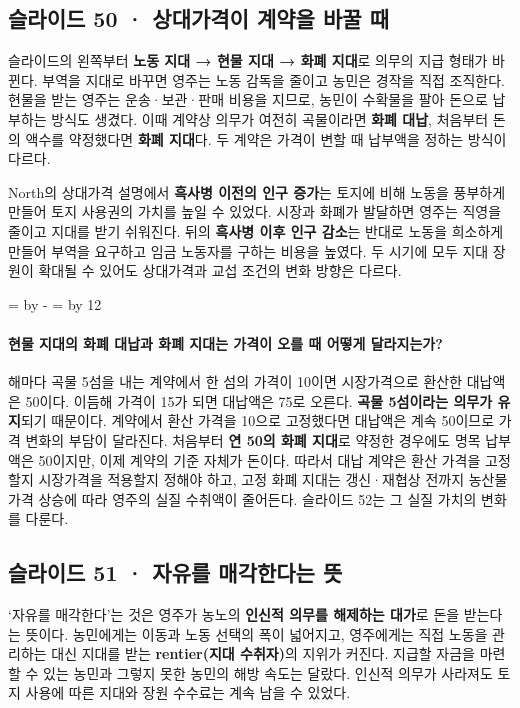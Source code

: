 \documentclass[10pt,a4paper]{article}
\newcommand{\ReserveQuestionSpace}{%
  \par\begingroup
  \dimen0=\pagegoal \advance\dimen0 by -\pagetotal
  \dimen2=\baselineskip \multiply\dimen2 by 12
  \ifdim\dimen0<\dimen2 \newpage\fi
  \endgroup}
\begin{document}
\subsection{슬라이드 50 · 상대가격이 계약을 바꿀 때}
슬라이드의 왼쪽부터 \textbf{노동 지대 → 현물 지대 → 화폐 지대}로 의무의 지급 형태가 바뀐다. 부역을 지대로 바꾸면 영주는 노동 감독을 줄이고 농민은 경작을 직접 조직한다. 현물을 받는 영주는 운송·보관·판매 비용을 지므로, 농민이 수확물을 팔아 돈으로 납부하는 방식도 생겼다. 이때 계약상 의무가 여전히 곡물이라면 \textbf{화폐 대납}, 처음부터 돈의 액수를 약정했다면 \textbf{화폐 지대}다. 두 계약은 가격이 변할 때 납부액을 정하는 방식이 다르다.\par

North의 상대가격 설명에서 \textbf{흑사병 이전의 인구 증가}는 토지에 비해 노동을 풍부하게 만들어 토지 사용권의 가치를 높일 수 있었다. 시장과 화폐가 발달하면 영주는 직영을 줄이고 지대를 받기 쉬워진다. 뒤의 \textbf{흑사병 이후 인구 감소}는 반대로 노동을 희소하게 만들어 부역을 요구하고 임금 노동자를 구하는 비용을 높였다. 두 시기에 모두 지대 장원이 확대될 수 있어도 상대가격과 교섭 조건의 변화 방향은 다르다.\par

\ReserveQuestionSpace
\paragraph{현물 지대의 화폐 대납과 화폐 지대는 가격이 오를 때 어떻게 달라지는가?}
해마다 곡물 5섬을 내는 계약에서 한 섬의 가격이 10이면 시장가격으로 환산한 대납액은 50이다. 이듬해 가격이 15가 되면 대납액은 75로 오른다. \textbf{곡물 5섬이라는 의무가 유지}되기 때문이다. 계약에서 환산 가격을 10으로 고정했다면 대납액은 계속 50이므로 가격 변화의 부담이 달라진다. 처음부터 \textbf{연 50의 화폐 지대}로 약정한 경우에도 명목 납부액은 50이지만, 이제 계약의 기준 자체가 돈이다. 따라서 대납 계약은 환산 가격을 고정할지 시장가격을 적용할지 정해야 하고, 고정 화폐 지대는 갱신·재협상 전까지 농산물 가격 상승에 따라 영주의 실질 수취액이 줄어든다. 슬라이드 52는 그 실질 가치의 변화를 다룬다.\par

\subsection{슬라이드 51 · 자유를 매각한다는 뜻}
‘자유를 매각한다’는 것은 영주가 농노의 \textbf{인신적 의무를 해제하는 대가}로 돈을 받는다는 뜻이다. 농민에게는 이동과 노동 선택의 폭이 넓어지고, 영주에게는 직접 노동을 관리하는 대신 지대를 받는 \textbf{rentier(지대 수취자)}의 지위가 커진다. 지급할 자금을 마련할 수 있는 농민과 그렇지 못한 농민의 해방 속도는 달랐다. 인신적 의무가 사라져도 토지 사용에 따른 지대와 장원 수수료는 계속 남을 수 있었다.\par
\end{document}
